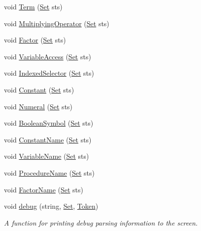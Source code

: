 \begin{DoxyCompactItemize}
\item 
void \hyperlink{classParser_ab7fd24e2aeb0ad2685e11f3ea5594049}{Term} (\hyperlink{classSet}{Set} sts)
\item 
void \hyperlink{classParser_a0f016865b3ae30a62a06abbb7fca7345}{MultiplyingOperator} (\hyperlink{classSet}{Set} sts)
\item 
void \hyperlink{classParser_a1310e1db541b2a3b614ec4491b7196ea}{Factor} (\hyperlink{classSet}{Set} sts)
\item 
void \hyperlink{classParser_ac004c4cc14aeca2512087a692594786b}{VariableAccess} (\hyperlink{classSet}{Set} sts)
\item 
void \hyperlink{classParser_ae6fd008bc26a87fbfe39d41a7391c01a}{IndexedSelector} (\hyperlink{classSet}{Set} sts)
\item 
void \hyperlink{classParser_aa1a1fb5ff017a1b3fbaabf63033586fa}{Constant} (\hyperlink{classSet}{Set} sts)
\item 
void \hyperlink{classParser_aadadd3280fa339b1433a8ad665479bc4}{Numeral} (\hyperlink{classSet}{Set} sts)
\item 
void \hyperlink{classParser_aa4a37b37b244053459fad1a82c7d9491}{BooleanSymbol} (\hyperlink{classSet}{Set} sts)
\item 
void \hyperlink{classParser_aec8b7271b672c8d609cf1df8b51cacc9}{ConstantName} (\hyperlink{classSet}{Set} sts)
\item 
void \hyperlink{classParser_a6ab8f6d47347f69f75a4bd8eb75988ac}{VariableName} (\hyperlink{classSet}{Set} sts)
\item 
void \hyperlink{classParser_a72cc285af2d83a0348a47a78aced1582}{ProcedureName} (\hyperlink{classSet}{Set} sts)
\item 
void \hyperlink{classParser_a3eeedadd101b70aef097d1ef8f5f8974}{FactorName} (\hyperlink{classSet}{Set} sts)
\item 
void \hyperlink{classParser_a862ea4d5a0d322471e3183aa4d51ad4b}{debug} (string, \hyperlink{classSet}{Set}, \hyperlink{classToken}{Token})
\begin{DoxyCompactList}\small\item\em A function for printing debug parsing information to the screen. \item\end{DoxyCompactList}\end{DoxyCompactItemize}
